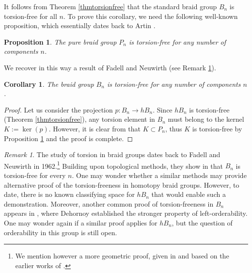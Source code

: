 \documentclass[11pt, a4paper, twoside,reqno]{amsart}
\theoremstyle{plain}
\newtheorem{prop}[thm]{Proposition}
\newtheorem{cor}[thm]{Corollary}
\theoremstyle{definition}
\theoremstyle{remark}
\newtheorem{rmq}[thm]{Remark}
\begin{document}
It follows from Theorem \ref{thmtorsionfree} that the standard braid group $B_n$ is torsion-free for all $n$. To prove this corollary, we need the following well-known proposition, which essentially dates back to Artin \cite{ArtinBraid}.
\begin{prop}\label{propPntorsionfree}
The pure braid group $P_n$ is torsion-free for any number of components $n$.
\end{prop}

We recover in this way a result of Fadell and Neuwirth (see Remark \ref{rmqdehornoy}).
\begin{cor}\label{coroBntorsionfree}
The braid group $B_n$ is torsion-free for any number of components $n$.
\end{cor}
\begin{proof}
Let us consider the projection $p: B_n \to hB_n$. Since $hB_n$ is torsion-free (Theorem \ref{thmtorsionfree}), any torsion element in $B_n$ must belong to the kernel $K := \ker(p)$. However, it is clear from \cite{GoldsmithHomotopybraids} that $K \subset P_n$, thus $K$ is torsion-free by Proposition \ref{propPntorsionfree} and the proof is complete.
\end{proof}
\begin{rmq}\label{rmqdehornoy}
The study of torsion in braid groups dates back to Fadell and Neuwirth in 1962.\footnote{We mention however a more geometric proof, given in \cite[\S2]{GonzalesBasicResultBraidGrp} and based on the earlier works of \cite{NielsenAbbildungsklassenEndlicherOrdnung,KerekjartoUberPerioTransfoKreisscheibeKugelflache,EilenbergTransfoPerioSurfSphere}.} Building upon topological methods, they show in \cite[Thm. 8]{FadellNeuwirthConfSpace} that $B_n$ is torsion-free for every $n$. One may wonder whether a similar methods may provide alternative proof of the torsion-freeness in homotopy braid groups. However, to date, there is no known classifying space for $hB_n$ that would enable such a demonstration. Moreover, another common proof of torsion-freeness in $B_n$ appears in \cite{DehornoyBraidGrpLeftDistribuOp}, where Dehornoy established the stronger property of left-orderability. One may wonder again if a similar proof applies for $hB_n$, but the question of orderability in this group is still open.
\end{rmq}




\end{document}
